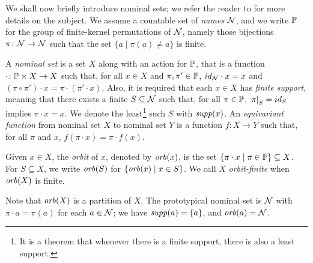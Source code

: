 We shall now briefly introduce nominal sets; we refer the reader to \cite{GP02} for more details on the subject. We assume a countable set of \emph{names} $\mathcal{N}$, and we write $\mathbb{P}$ for the group of finite-kernel permutations of $\mathcal{N}$, namely those bijections $\pi \colon \mathcal{N} \to \mathcal{N}$ such that the set $\{ a \mid \pi(a) \neq a \}$ is finite.
\begin{definition}
A \emph{nominal set} is a set $X$ along with an action for $\mathbb{P}$, that is a function $\cdot \colon \mathbb{P} \times X \to X$ such that, for all $x \in X$ and $\pi,\pi' \in \mathbb{P}$, $id_{\mathcal{N}} \cdot x = x$ and $(\pi \circ \pi') \cdot x = \pi \cdot (\pi' \cdot x)$. Also, it is required that each $x \in X$ has \emph{finite support}, meaning that there exists a finite $S \subseteq \mathcal{N}$ such that, for all $\pi \in \mathbb{P}$, $\left.\pi\right|_{S} = id_S$ implies $\pi \cdot x = x$. We denote the least\footnote{It is a theorem that whenever there is a finite support, there is also a least support.} such $S$ with $\mathit{supp}(x)$. An \emph{equivariant function} from nominal set $X$ to nominal set $Y$ is a function $f : X \to Y$ such that, for all $\pi$ and $x$, $f(\pi \cdot x) = \pi \cdot f(x)$.
\end{definition}
%
\begin{definition}
Given $x \in X$, the \emph{orbit} of $x$, denoted by $\mathit{orb}(x) $, is the set $\{ \pi \cdot x \mid \pi \in \mathbb{P}\} \subseteq X$. For $S \subseteq X$, we write $\mathit{orb}(S)$ for $\{ \mathit{orb}(x) \mid x \in S\}$. We call $X$ \emph{orbit-finite} when $\mathit{orb}(X)$ is finite.
\end{definition}

\noindent Note that $\mathit{orb}(X)$ is a partition of $X$. The prototypical nominal set is $\mathcal{N}$ with $\pi \cdot a = \pi(a)$ for each $a \in \mathcal{N}$; we have $\mathit{supp}(a) = \{a\}$, and $\mathit{orb}(a) = \mathcal{N}$.
